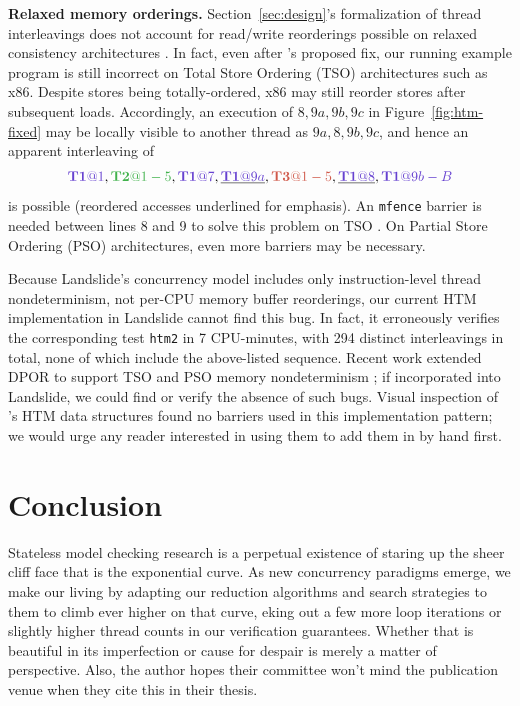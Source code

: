 \documentclass[10pt]{sigplanconf}
\begin{document}
{\bf Relaxed memory orderings.}
Section~\ref{sec:design}'s formalization of thread interleavings does not account for read/write reorderings
possible on relaxed consistency architectures \cite{memory-consistency-models}.
In fact,
even after \cite{htm-mario}'s proposed fix,
our running example program is still incorrect on Total Store Ordering (TSO) architectures such as x86.
Despite stores being totally-ordered, x86 may still reorder stores after subsequent loads.
Accordingly, an execution of $8,9a,9b,9c$ in Figure~\ref{fig:htm-fixed}
may be locally visible to another thread as $9a,8,9b,9c$,
and hence an apparent interleaving of
\[
	\tiat{1},\tjat{1-5},\tiat{7},\underline{\tiat{9a}},\tkat{1-5},\underline{\tiat{8}},\tiat{9b-B}
\]
is possible
(reordered accesses underlined for emphasis).
An {\tt mfence} barrier is needed between lines 8 and 9 to solve this problem on TSO \cite{tsx-need-barrier}.
On Partial Store Ordering (PSO) architectures, even more barriers may be necessary.

Because Landslide's concurrency model includes only instruction-level thread nondeterminism,
not per-CPU memory buffer reorderings,
our current HTM implementation in Landslide cannot find this bug.
In fact, it erroneously verifies the corresponding test {\tt htm2} in 7 CPU-minutes,
with 294 distinct interleavings in total,
none of which include the above-listed sequence.
Recent work extended DPOR to support TSO and PSO memory nondeterminism \cite{tsopso};
if incorporated into Landslide, we could find or verify the absence of such bugs.
Visual inspection of \cite{htm-mario}'s HTM data structures found no barriers used in this implementation pattern;
we would urge any reader interested in using them to add them in by hand first.


\section{Conclusion}

Stateless model checking research is a perpetual existence of staring up the sheer cliff face that is the exponential curve.
As new concurrency paradigms emerge,
we make our living by adapting our reduction algorithms and search strategies to them to climb ever higher on that curve,
eking out a few more loop iterations or slightly higher thread counts in our verification guarantees.
Whether that is beautiful in its imperfection or cause for despair is merely a matter of perspective.
Also, the author hopes their committee won't mind the publication venue when they cite this in their thesis.
\end{document}
